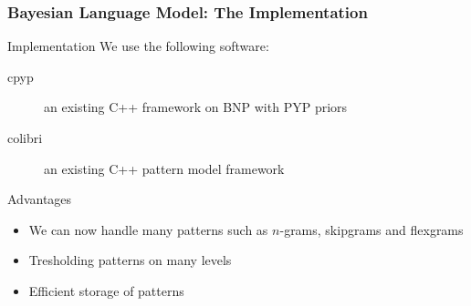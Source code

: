 \documentclass{beamer}
\begin{document}
\begin{frame}
    \frametitle{Bayesian Language Model: The Implementation}

    \begin{block}{Implementation}
        We use the following software:
        \begin{description}
            \item[cpyp] an existing C++ framework on BNP with PYP priors
            \item[colibri] an existing C++ pattern model framework 
        \end{description}
    \end{block}

    \begin{block}{Advantages}
        \begin{itemize}
            \item We can now handle many patterns such as $n$-grams, skipgrams and flexgrams
            \item Tresholding patterns on many levels
            \item Efficient storage of patterns
        \end{itemize}
    \end{block}
\end{frame}
\end{document}
